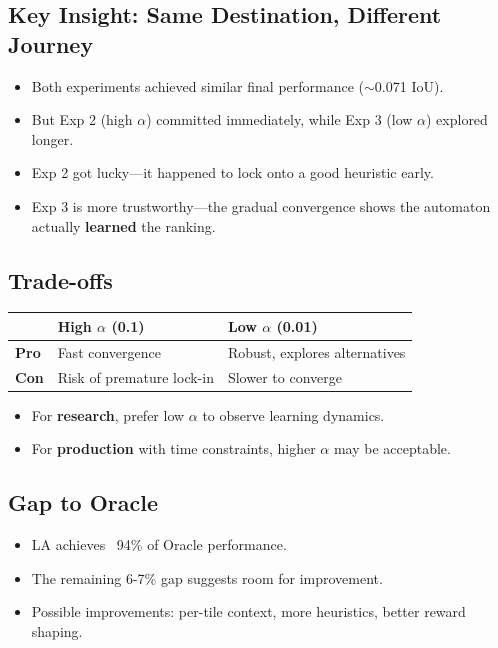 \documentclass[11pt]{article}
\newenvironment{talkingpoints}{%
  \begin{itemize}[leftmargin=1.5em, itemsep=0.3em]
}{%
  \end{itemize}
}
\begin{document}
\subsection{Key Insight: Same Destination, Different Journey}

\begin{talkingpoints}
  \item Both experiments achieved similar final performance ($\sim$0.071 IoU).
  \item But Exp 2 (high $\alpha$) committed immediately, while Exp 3 (low $\alpha$) explored longer.
  \item Exp 2 got lucky---it happened to lock onto a good heuristic early.
  \item Exp 3 is more trustworthy---the gradual convergence shows the automaton actually \textbf{learned} the ranking.
\end{talkingpoints}

\subsection{Trade-offs}

\begin{center}
\begin{tabular}{lll}
\toprule
& \textbf{High $\alpha$ (0.1)} & \textbf{Low $\alpha$ (0.01)} \\
\midrule
\textbf{Pro} & Fast convergence & Robust, explores alternatives \\
\textbf{Con} & Risk of premature lock-in & Slower to converge \\
\bottomrule
\end{tabular}
\end{center}

\begin{talkingpoints}
  \item For \textbf{research}, prefer low $\alpha$ to observe learning dynamics.
  \item For \textbf{production} with time constraints, higher $\alpha$ may be acceptable.
\end{talkingpoints}

\subsection{Gap to Oracle}

\begin{talkingpoints}
  \item LA achieves ~94\% of Oracle performance.
  \item The remaining 6-7\% gap suggests room for improvement.
  \item Possible improvements: per-tile context, more heuristics, better reward shaping.
\end{talkingpoints}
\end{document}
